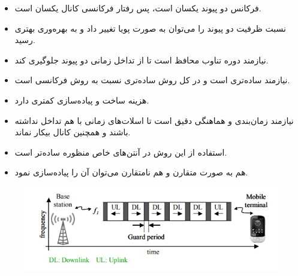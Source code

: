 {\begin{itemize}
    \item
    فرکانس دو پیوند یکسان است، پس رفتار فرکانسی کانال یکسان است.
    
    \item
    نسبت ظرفیت دو پیوند را می‌توان به صورت پویا تغییر داد و به بهره‌وری بهتری رسید.
    
    \item
    نیازمند دوره تناوب محافظ
    است تا از تداخل زمانی دو پیوند جلوگیری کند.
    
    \item
    نیازمند
    ساده‌تری است و در کل روش ساده‌تری نسبت به روش فرکانسی است.
    
    \item
    هزینه ساخت و پیاده‌سازی کمتری دارد.

    \item
    نیازمند زمان‌بندی و هماهنگی دقیق است تا اسلات‌های زمانی با هم تداخل نداشته باشند و همچنین کانال بیکار نماند.
    
    \item
    استفاده از این روش در آنتن‌های خاص منظوره ساده‌تر است.
    
    \item
    هم به صورت متقارن و هم نامتقارن می‌توان آن را پیاده‌سازی نمود.
\end{itemize}

\begin{figure}[H]
    \includegraphics[width=12cm]{Images/TDD.jpg}
    \centering
    \caption{}
\end{figure}
}